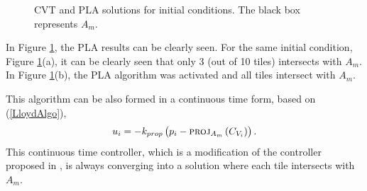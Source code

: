 \documentclass{iacas}
\begin{document}
\begin{figure}
	\captionsetup[subfigure]{position=b}
	\centering
	\caption{CVT and PLA solutions for initial conditions. The black box represents $A_m$.}
\label{fig:projected lloyds algorithm}
\end{figure}

In Figure \ref{fig:projected lloyds algorithm}, the PLA results can be clearly seen. For the same initial condition, Figure \ref{fig:projected lloyds algorithm}(a), it can be clearly seen that only 3 (out of 10 tiles) intersects with $A_m$. In Figure \ref{fig:projected lloyds algorithm}(b), the PLA algorithm was activated and all tiles intersect with $A_m$.

This algorithm can be also formed in a continuous time form, based on (\ref{LloydAlgo}), %
\begin{equation} \label{ProjectedLloydsContol}
u_{i} = -k_{prop}\left( p_i - \textsc{proj}_{A_m}\left( C_{V_{i}} \right) \right).
\end{equation}
This continuous time controller, which is a modification of the controller proposed in \cite{Cortes2004}, is always converging into a solution where each tile intersects with $A_m$.
\end{document}
